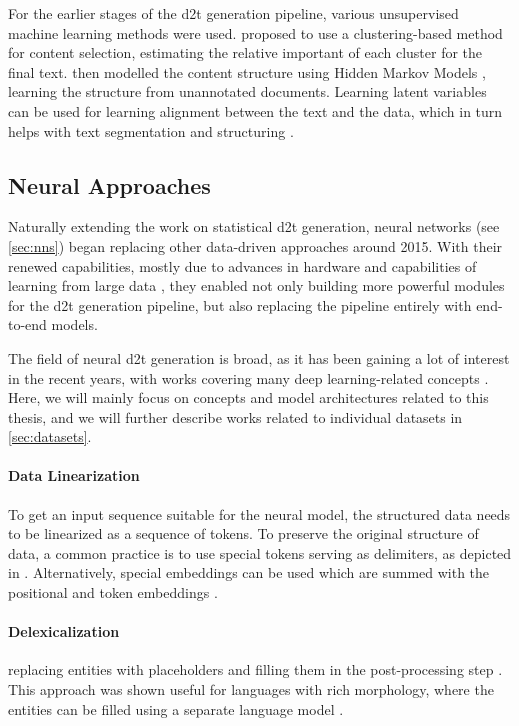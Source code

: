 For the earlier stages of the \ac{d2t} generation pipeline, various unsupervised machine learning methods were used. \citet{duboue2003statistical} proposed to use a clustering-based method for content selection, estimating the relative important of each cluster for the final text. \citet{barzilay2004catching} then modelled the content structure using Hidden Markov Models \cite{baum1966statistical}, learning the structure from unannotated documents. Learning latent variables can be used for learning alignment between the text and the data, which in turn helps with text segmentation and structuring \cite{liang2009learning}.

\subsection{Neural Approaches}
\label{sec:neural-d2t}
Naturally extending the work on statistical \ac{d2t} generation, neural networks (see \autoref{sec:nns}) began replacing other data-driven approaches around 2015. With their renewed capabilities, mostly due to advances in hardware \cite{hooker2021hardware} and capabilities of learning from large data \cite{lecun2015deep}, they enabled not only building more powerful modules for the \ac{d2t} generation pipeline, but also replacing the pipeline entirely with end-to-end models.

The field of neural \ac{d2t} generation is broad, as it has been gaining a lot of interest in the recent years, with works covering many deep learning-related concepts \cite{sharmaInnovationsNeuralDatatotext2022, lin2023survey}. Here, we will mainly focus on concepts and model architectures related to this thesis, and we will further describe works related to individual datasets in \autoref{sec:datasets}.


\paragraph{Data Linearization} To get an input sequence suitable for the neural model, the structured data needs to be linearized as a sequence of tokens. To preserve the original structure of data, a common practice is to use special tokens serving as delimiters, as depicted in  \cite{yang2020improving,hoyle2021promoting,xieUnifiedSKGUnifyingMultiTasking2022}. Alternatively, special embeddings can be used which are summed with the positional and token embeddings \cite{wang2021tuta,yangTableFormerRobustTransformer2022}.

\paragraph{Delexicalization} replacing entities with placeholders and filling them in the post-processing step \cite{oh2000stochastic,mairesse2010phrase,wen2015semantically}. This approach was shown useful for languages with rich morphology, where the entities can be filled using a separate language model \cite{duvsek2019neural}.

